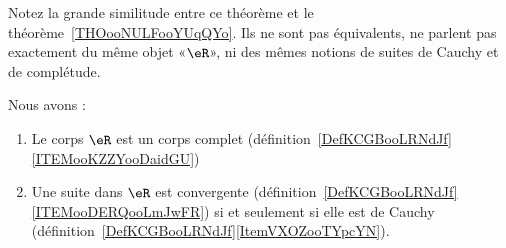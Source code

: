 Notez la grande similitude entre ce théorème et le théorème~\ref{THOooNULFooYUqQYo}. Ils ne sont pas équivalents, ne parlent pas exactement du même objet «\( \eR\)», ni des mêmes notions de suites de Cauchy et de complétude.

\begin{theorem} \label{THOooUFVJooYJlieh}
	Nous avons :
	\begin{enumerate}
		\item
		      Le corps \( \eR\) est un corps complet (définition~\ref{DefKCGBooLRNdJf}\ref{ITEMooKZZYooDaidGU})
		\item
		      Une suite dans \( \eR\) est convergente (définition~\ref{DefKCGBooLRNdJf}\ref{ITEMooDERQooLmJwFR}) si et seulement si elle est de Cauchy (définition~\ref{DefKCGBooLRNdJf}\ref{ItemVXOZooTYpcYN}).
	\end{enumerate}
\end{theorem}

